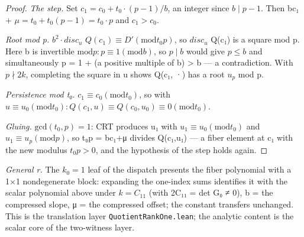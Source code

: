 \documentclass[11pt]{article}
\theoremstyle{plain}
\theoremstyle{definition}
\theoremstyle{remark}
\theoremstyle{plain}
\theoremstyle{definition}
\theoremstyle{remark}
\theoremstyle{plain}
\theoremstyle{definition}
\theoremstyle{remark}
\begin{document}
\begin{proof}
\emph{The step.} Set $c_{1} = c_{0} + t_{0}·(p−1)/b$, an integer since $b ∣ p−1$. Then bc₁ + $μ = t_{0} + t_{0}(p−1) = t_{0}·p$ and $c_{1} > c_{0}$.

\emph{Root mod p.} $b^{2}·disc_{u}$ $Q(c_{1}) ≡ D′ (\mathrm{mod} t_{0}p)$, so $disc_{u}$ Q(c₁) is a square mod p. Here b is invertible $\mathrm{mod} p: p ≡ 1 (\mathrm{mod} b)$, so $p ∣ b$ would give $p ≤ b$ and simultaneously p = 1 + (a positive multiple of b) > b — a contradiction. With $p ∤ 2k$, completing the square in u shows Q(c₁, ·) has a root $u_{p}$ mod p.

\emph{Persistence mod t₀.} $c_{1} ≡ c_{0} (\mathrm{mod} t_{0})$, so with $u ≡ u_{0} (\mathrm{mod} t_{0}): Q(c_{1},u) ≡ Q(c_{0},u_{0}) ≡ 0 (\mathrm{mod} t_{0})$.

\emph{Gluing.} $\mathrm{gcd}(t_{0},p) = 1$: CRT produces u₁ with $u_{1} ≡ u_{0} (\mathrm{mod} t_{0})$ and $u_{1} ≡ u_{p} (\mathrm{mod} p)$, so t₀p = bc₁+μ divides Q(c₁,u₁) — a fiber element at c₁ with the new modulus $t_{0}p > 0$, and the hypothesis of the step holds again.

\end{proof}
\emph{General r.} The $k_{0} = 1$ leaf of the dispatch presents the fiber polynomial with a 1×1 nondegenerate block: expanding the one-index sums identifies it with the scalar polynomial above under $k = C_{11}$ (with 2C₁₁ = det G₀ ≠ 0), b = the compressed slope, μ = the compressed offset; the constant transfers unchanged. This is the translation layer \texttt{QuotientRankOne.\allowbreak{}lean}; the analytic content is the scalar core of the two-witness layer.
\end{document}
